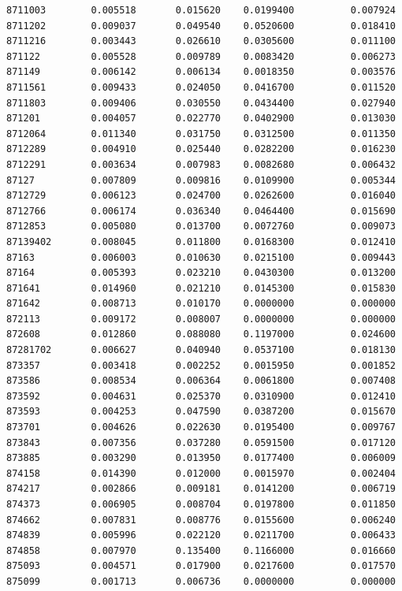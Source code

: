 \documentclass[
  letterpaper,
  DIV=11,
  numbers=noendperiod]{scrartcl}
\begin{document}
\begin{verbatim}
8711003        0.005518       0.015620    0.0199400          0.007924
8711202        0.009037       0.049540    0.0520600          0.018410
8711216        0.003443       0.026610    0.0305600          0.011100
871122         0.005528       0.009789    0.0083420          0.006273
871149         0.006142       0.006134    0.0018350          0.003576
8711561        0.009433       0.024050    0.0416700          0.011520
8711803        0.009406       0.030550    0.0434400          0.027940
871201         0.004057       0.022770    0.0402900          0.013030
8712064        0.011340       0.031750    0.0312500          0.011350
8712289        0.004910       0.025440    0.0282200          0.016230
8712291        0.003634       0.007983    0.0082680          0.006432
87127          0.007809       0.009816    0.0109900          0.005344
8712729        0.006123       0.024700    0.0262600          0.016040
8712766        0.006174       0.036340    0.0464400          0.015690
8712853        0.005080       0.013700    0.0072760          0.009073
87139402       0.008045       0.011800    0.0168300          0.012410
87163          0.006003       0.010630    0.0215100          0.009443
87164          0.005393       0.023210    0.0430300          0.013200
871641         0.014960       0.021210    0.0145300          0.015830
871642         0.008713       0.010170    0.0000000          0.000000
872113         0.009172       0.008007    0.0000000          0.000000
872608         0.012860       0.088080    0.1197000          0.024600
87281702       0.006627       0.040940    0.0537100          0.018130
873357         0.003418       0.002252    0.0015950          0.001852
873586         0.008534       0.006364    0.0061800          0.007408
873592         0.004631       0.025370    0.0310900          0.012410
873593         0.004253       0.047590    0.0387200          0.015670
873701         0.004626       0.022630    0.0195400          0.009767
873843         0.007356       0.037280    0.0591500          0.017120
873885         0.003290       0.013950    0.0177400          0.006009
874158         0.014390       0.012000    0.0015970          0.002404
874217         0.002866       0.009181    0.0141200          0.006719
874373         0.006905       0.008704    0.0197800          0.011850
874662         0.007831       0.008776    0.0155600          0.006240
874839         0.005996       0.022120    0.0211700          0.006433
874858         0.007970       0.135400    0.1166000          0.016660
875093         0.004571       0.017900    0.0217600          0.017570
875099         0.001713       0.006736    0.0000000          0.000000

\end{verbatim}
\end{document}

